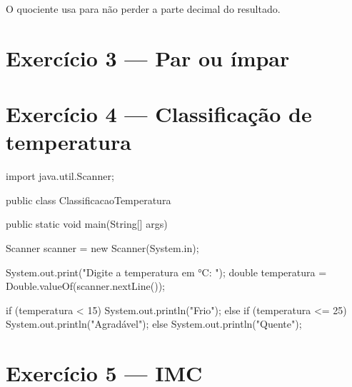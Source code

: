 \documentclass[11pt,a4paper]{article}
\begin{document}
O quociente usa  para não perder a parte decimal do resultado.

\section{Exercício 3 --- Par ou ímpar}


\section{Exercício 4 --- Classificação de temperatura}

\begin{javacode}
import java.util.Scanner;

public class ClassificacaoTemperatura {
    public static void main(String[] args) {
        Scanner scanner = new Scanner(System.in);

        System.out.print("Digite a temperatura em °C: ");
        double temperatura = Double.valueOf(scanner.nextLine());

        if (temperatura < 15) {
            System.out.println("Frio");
        } else if (temperatura <= 25) {
            System.out.println("Agradável");
        } else {
            System.out.println("Quente");
        }
    }
}
\end{javacode}

\section{Exercício 5 --- IMC}
\end{document}
